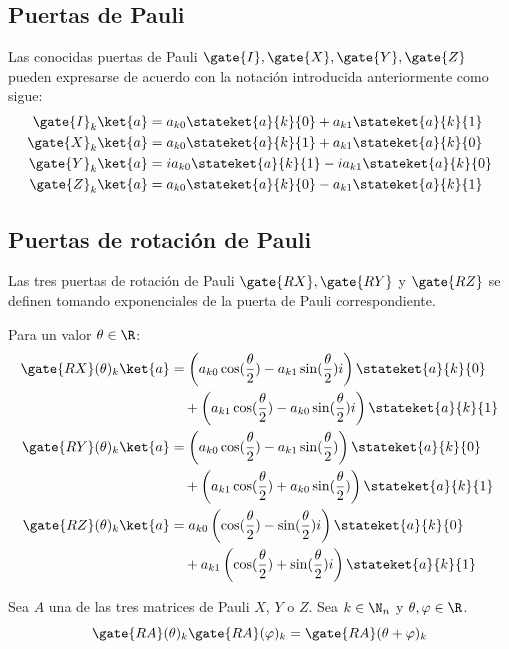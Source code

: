 \subsection{Puertas de Pauli}
	Las conocidas puertas de Pauli $\gate{I}, \gate{X}, \gate{Y}, \gate{Z}$ pueden expresarse de acuerdo con la notación introducida anteriormente como sigue:
	\begin{align}
		\gate{I}_k\ket{a} &= a_{k0}\stateket{a}{k}{0}+a_{k1}\stateket{a}{k}{1} \\
		\gate{X}_k\ket{a} &= a_{k0}\stateket{a}{k}{1}+a_{k1}\stateket{a}{k}{0}\\
		\gate{Y}_k\ket{a} &= ia_{k0}\stateket{a}{k}{1}-i a_{k1}\stateket{a}{k}{0}\\
		\gate{Z}_k\ket{a} &= a_{k0}\stateket{a}{k}{0}-a_{k1}\stateket{a}{k}{1}
	\end{align}

\subsection{Puertas de rotación de Pauli}
Las tres puertas de rotación de Pauli $\gate{RX}, \gate{RY}$ y $\gate{RZ}$ se definen tomando exponenciales de la puerta de Pauli correspondiente.

Para un valor $\theta\in\R$:
\begin{align}
    \gate{RX}(\theta)_k\ket{a} &= \left(a_{k0}\cos(\frac{\theta}{2})-a_{k1}\sin(\frac{\theta}{2})i\right)\stateket{a}{k}{0}\nonumber\\
    &\quad+\left(a_{k1}\cos(\frac{\theta}{2})-a_{k0}\sin(\frac{\theta}{2})i\right)\stateket{a}{k}{1}\\
    \gate{RY}(\theta)_k\ket{a} &= \left(a_{k0}\cos(\frac{\theta}{2})-a_{k1}\sin(\frac{\theta}{2})\right)\stateket{a}{k}{0}\nonumber\\
    &\quad+\left(a_{k1}\cos(\frac{\theta}{2})+a_{k0}\sin(\frac{\theta}{2})\right)\stateket{a}{k}{1}\\
    \gate{RZ}(\theta)_k\ket{a} &= a_{k0}\left(\cos(\frac{\theta}{2})-\sin(\frac{\theta}{2})i\right)\stateket{a}{k}{0}\nonumber\\
    &\quad+a_{k1}\left(\cos(\frac{\theta}{2})+\sin(\frac{\theta}{2})i\right)\stateket{a}{k}{1}
\end{align}

\begin{proposition}
	Sea $A$ una de las tres matrices de Pauli $X$, $Y$ o $Z$. Sea $k\in\N_n$ y $\theta, \varphi\in\R$.
	\begin{equation}
		\gate{RA}(\theta)_k\gate{RA}(\varphi)_k=\gate{RA}(\theta+\varphi)_k
	\end{equation}
\end{proposition}
